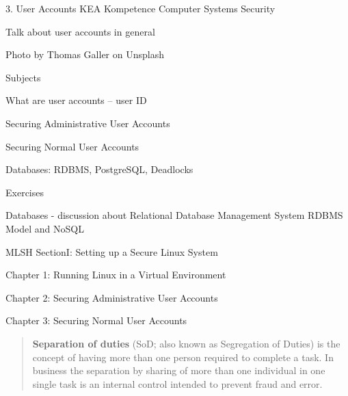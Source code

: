 \documentclass[Screen16to9,17pt]{foils}
\begin{document}
\mytitlepage
{3. User Accounts}
{KEA Kompetence Computer Systems Security \the\year}






\begin{list2}
\item Talk about user accounts in general
\end{list2}

{\small\hfill  Photo by Thomas Galler on Unsplash}


\begin{list1}
\item Subjects
\begin{list2}
\item What are user accounts -- user ID
\item Securing Administrative User Accounts
\item Securing Normal User Accounts
\item Databases: RDBMS, PostgreSQL, Deadlocks
\end{list2}
\item Exercises
\begin{list2}
\item Databases - discussion about Relational Database Management System RDBMS Model and NoSQL
\end{list2}
\end{list1}




MLSH SectionI: Setting up a Secure Linux System
\begin{list1}
\item Chapter 1: Running Linux in a Virtual Environment
\item Chapter 2: Securing Administrative User Accounts
\item Chapter 3: Securing Normal User Accounts
\end{list1}




\begin{quote}
{\bf Separation of duties} (SoD; also known as Segregation of Duties) is the concept of having more than one person required to complete a task. In business the separation by sharing of more than one individual in one single task is an internal control intended to prevent fraud and error.
\end{quote}
\end{document}

